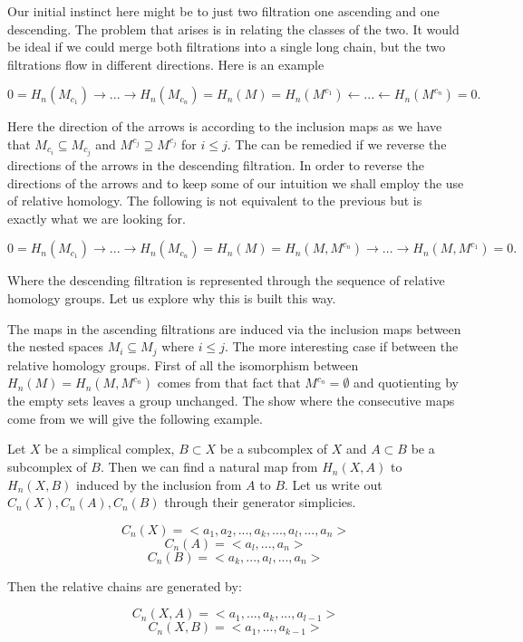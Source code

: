 Our initial instinct here might be to just two filtration one ascending and one descending. The problem that arises is in relating the classes of the two. It would be ideal if we could merge both filtrations into a single long chain, but the two filtrations flow in different directions. Here is an example

$$ 0 = H_n(M_{c_1}) \rightarrow ... \rightarrow H_n(M_{c_n}) = H_n(M) = H_n(M^{c_1}) \leftarrow ... \leftarrow H_n(M^{c_{n}}) = 0.$$

Here the direction of the arrows is according to the inclusion maps as we have that $M_{c_i} \subseteq M_{c_j}$ and $M^{c_j} \supseteq M^{c_j}$ for $i \le j$. The can be remedied if we reverse the directions of the arrows in the descending filtration. In order to reverse the directions of the arrows and to keep some of our intuition we shall employ the use of relative homology. The following is not equivalent to the previous but is exactly what we are looking for.

$$ 0 = H_n(M_{c_1}) \rightarrow ... \rightarrow H_n(M_{c_n}) = H_n(M) = H_n(M, M^{c_n}) \rightarrow ... \rightarrow H_n(M, M^{c_{1}}) = 0.$$

Where the descending filtration is represented through the sequence of relative homology groups. Let us explore why this is built this way.

The maps in the ascending filtrations are induced via the inclusion maps between the nested spaces $M_i \subseteq M_j$  where $i \le j$. The more interesting case if between the relative homology groups. First of all the isomorphism between $H_n(M) = H_n(M, M^{c_n})$ comes from that fact that $M^{c_n} = \emptyset$ and quotienting by the empty sets leaves a group unchanged. The show where the consecutive maps come from we will give the following example.

Let $X$ be a simplical complex, $B \subset X$ be a subcomplex of $X$ and $A \subset B$ be a subcomplex of $B$. Then we can find a natural map from $H_n(X, A)$ to $H_n(X, B)$ induced by the inclusion from $A$ to $B$. Let us write out $C_n(X), C_n(A), C_n(B)$ through their generator simplicies.

$$ C_n(X) = <a_1, a_2, ..., a_k, ..., a_l, ..., a_n> $$
$$ C_n(A) = <a_l, ..., a_n>$$
$$ C_n(B) = <a_k, ..., a_l, ..., a_n>$$


Then the relative chains are generated by:

$$ C_n(X, A) = <a_1, ..., a_k, ..., a_{l-1}>$$
$$ C_n(X, B) = <a_1, ..., a_{k-1}>$$


